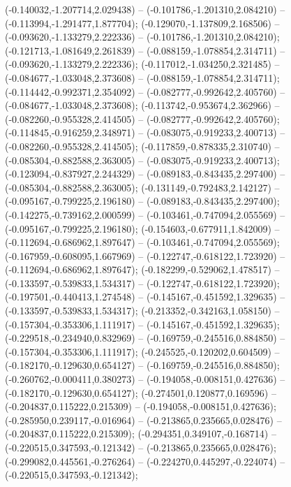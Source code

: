  (-0.140032,-1.207714,2.029438) -- (-0.101786,-1.201310,2.084210) -- (-0.113994,-1.291477,1.877704);
 (-0.129070,-1.137809,2.168506) -- (-0.093620,-1.133279,2.222336) -- (-0.101786,-1.201310,2.084210);
 (-0.121713,-1.081649,2.261839) -- (-0.088159,-1.078854,2.314711) -- (-0.093620,-1.133279,2.222336);
 (-0.117012,-1.034250,2.321485) -- (-0.084677,-1.033048,2.373608) -- (-0.088159,-1.078854,2.314711);
 (-0.114442,-0.992371,2.354092) -- (-0.082777,-0.992642,2.405760) -- (-0.084677,-1.033048,2.373608);
 (-0.113742,-0.953674,2.362966) -- (-0.082260,-0.955328,2.414505) -- (-0.082777,-0.992642,2.405760);
 (-0.114845,-0.916259,2.348971) -- (-0.083075,-0.919233,2.400713) -- (-0.082260,-0.955328,2.414505);
 (-0.117859,-0.878335,2.310740) -- (-0.085304,-0.882588,2.363005) -- (-0.083075,-0.919233,2.400713);
 (-0.123094,-0.837927,2.244329) -- (-0.089183,-0.843435,2.297400) -- (-0.085304,-0.882588,2.363005);
 (-0.131149,-0.792483,2.142127) -- (-0.095167,-0.799225,2.196180) -- (-0.089183,-0.843435,2.297400);
 (-0.142275,-0.739162,2.000599) -- (-0.103461,-0.747094,2.055569) -- (-0.095167,-0.799225,2.196180);
 (-0.154603,-0.677911,1.842009) -- (-0.112694,-0.686962,1.897647) -- (-0.103461,-0.747094,2.055569);
 (-0.167959,-0.608095,1.667969) -- (-0.122747,-0.618122,1.723920) -- (-0.112694,-0.686962,1.897647);
 (-0.182299,-0.529062,1.478517) -- (-0.133597,-0.539833,1.534317) -- (-0.122747,-0.618122,1.723920);
 (-0.197501,-0.440413,1.274548) -- (-0.145167,-0.451592,1.329635) -- (-0.133597,-0.539833,1.534317);
 (-0.213352,-0.342163,1.058150) -- (-0.157304,-0.353306,1.111917) -- (-0.145167,-0.451592,1.329635);
 (-0.229518,-0.234940,0.832969) -- (-0.169759,-0.245516,0.884850) -- (-0.157304,-0.353306,1.111917);
 (-0.245525,-0.120202,0.604509) -- (-0.182170,-0.129630,0.654127) -- (-0.169759,-0.245516,0.884850);
 (-0.260762,-0.000411,0.380273) -- (-0.194058,-0.008151,0.427636) -- (-0.182170,-0.129630,0.654127);
 (-0.274501,0.120877,0.169596) -- (-0.204837,0.115222,0.215309) -- (-0.194058,-0.008151,0.427636);
 (-0.285950,0.239117,-0.016964) -- (-0.213865,0.235665,0.028476) -- (-0.204837,0.115222,0.215309);
 (-0.294351,0.349107,-0.168714) -- (-0.220515,0.347593,-0.121342) -- (-0.213865,0.235665,0.028476);
 (-0.299082,0.445561,-0.276264) -- (-0.224270,0.445297,-0.224074) -- (-0.220515,0.347593,-0.121342);
